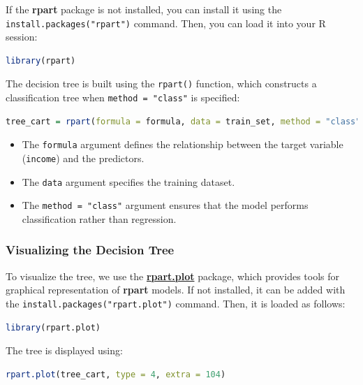 \documentclass[
]{book}
\newcommand{\passthrough}[1]{#1}
\providecommand{\tightlist}{%
  \setlength{\itemsep}{0pt}\setlength{\parskip}{0pt}}
\theoremstyle{definition}
\theoremstyle{definition}
\theoremstyle{definition}
\theoremstyle{definition}
\theoremstyle{remark}
\begin{document}
If the \textbf{rpart} package is not installed, you can install it using the \passthrough{\lstinline!install.packages("rpart")!} command. Then, you can load it into your R session:

\begin{lstlisting}[language=R]
library(rpart)
\end{lstlisting}

The decision tree is built using the \passthrough{\lstinline!rpart()!} function, which constructs a classification tree when \passthrough{\lstinline!method = "class"!} is specified:

\begin{lstlisting}[language=R]
tree_cart = rpart(formula = formula, data = train_set, method = "class")
\end{lstlisting}

\begin{itemize}
\tightlist
\item
  The \passthrough{\lstinline!formula!} argument defines the relationship between the target variable (\passthrough{\lstinline!income!}) and the predictors.
\item
  The \passthrough{\lstinline!data!} argument specifies the training dataset.
\item
  The \passthrough{\lstinline!method = "class"!} argument ensures that the model performs classification rather than regression.
\end{itemize}

\subsubsection*{Visualizing the Decision Tree}\label{visualizing-the-decision-tree}

To visualize the tree, we use the \href{https://CRAN.R-project.org/package=rpart.plot}{\textbf{rpart.plot}} package, which provides tools for graphical representation of \textbf{rpart} models. If not installed, it can be added with the \passthrough{\lstinline!install.packages("rpart.plot")!} command. Then, it is loaded as follows:

\begin{lstlisting}[language=R]
library(rpart.plot)
\end{lstlisting}

The tree is displayed using:

\begin{lstlisting}[language=R]
rpart.plot(tree_cart, type = 4, extra = 104)
\end{lstlisting}
\end{document}
